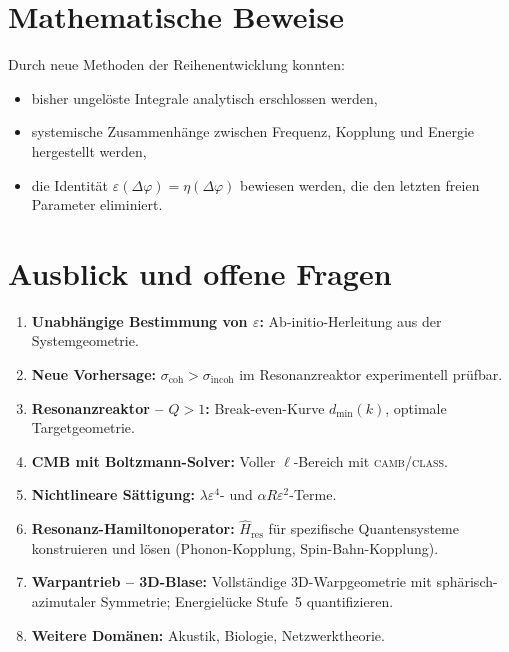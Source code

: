 \documentclass[a4paper,11pt]{article}
\begin{document}
	\section{Mathematische Beweise}
	
	Durch neue Methoden der Reihenentwicklung konnten:
	\begin{itemize}
		\item bisher ungel\"oste Integrale analytisch
		erschlossen werden,
		\item systemische Zusammenh\"ange zwischen Frequenz,
		Kopplung und Energie hergestellt werden,
		\item die Identit\"at
		$\varepsilon(\Delta\varphi) = \eta(\Delta\varphi)$
		bewiesen werden, die den letzten freien Parameter
		eliminiert.
	\end{itemize}
	
	\section{Ausblick und offene Fragen}
	
	\begin{enumerate}
		\item \textbf{Unabh\"angige Bestimmung von
			$\varepsilon$:}
		Ab-initio-Herleitung aus der Systemgeometrie.
		
		\item \textbf{Neue Vorhersage:}
		$\sigma_{\mathrm{coh}} > \sigma_{\mathrm{incoh}}$
		im Resonanzreaktor experimentell pr\"ufbar.
		
		\item \textbf{Resonanzreaktor -- $Q > 1$:}
		Break-even-Kurve $d_{\min}(k)$, optimale
		Targetgeometrie.
		
		\item \textbf{CMB mit Boltzmann-Solver:}
		Voller $\ell$-Bereich mit
		\textsc{camb}/\textsc{class}.
		
		\item \textbf{Nichtlineare S\"attigung:}
		$\lambda\varepsilon^4$- und
		$\alpha R\varepsilon^2$-Terme.
		
		\item \textbf{Resonanz-Hamiltonoperator:}
		$\hat{H}_{\mathrm{res}}$ f\"ur spezifische
		Quantensysteme konstruieren und l\"osen
		(Phonon-Kopplung, Spin-Bahn-Kopplung).
		
		\item \textbf{Warpantrieb -- 3D-Blase:}
		Vollst\"andige 3D-Warpgeometrie mit
		sph\"arisch-azimutaler Symmetrie;
		Energiel\"ucke Stufe~5 quantifizieren.
		
		\item \textbf{Weitere Dom\"anen:}
		Akustik, Biologie, Netzwerktheorie.
	\end{enumerate}
	
\end{document}

